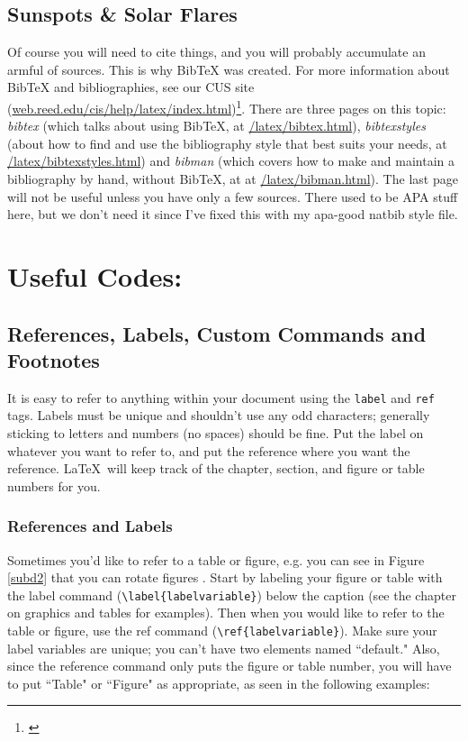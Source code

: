 \documentclass[12pt,twoside]{reedthesis}
\begin{document}
\begin{enumerate}
\begin{enumerate}
\section{Sunspots & Solar Flares}
	Of course you will need to cite things, and you will probably accumulate an armful of sources. This is why BibTeX was created. For more information about BibTeX and bibliographies, see our CUS site (\url{web.reed.edu/cis/help/latex/index.html})\footnote{\cite{reedweb:2007}}. There are three pages on this topic: {\it bibtex} (which talks about using BibTeX, at \url{/latex/bibtex.html}), {\it bibtexstyles} (about how to find and use the bibliography style that best suits your needs, at \url{/latex/bibtexstyles.html}) and {\it bibman} (which covers how to make and maintain a bibliography by hand, without BibTeX, at at \url{/latex/bibman.html}). The last page will not be useful unless you have only a few sources. There used to be APA stuff here, but we don't need it since I've fixed this with my apa-good natbib style file.






\chapter{Useful Codes:}
	
	
\section{References, Labels, Custom Commands and Footnotes}
It is easy to refer to anything within your document using the \texttt{label} and \texttt{ref} tags.  Labels must be unique and shouldn't use any odd characters; generally sticking to letters and numbers (no spaces) should be fine. Put the label on whatever you want to refer to, and put the reference where you want the reference. \LaTeX\ will keep track of the chapter, section, and figure or table numbers for you. 

\subsection{References and Labels}
Sometimes you'd like to refer to a table or figure, e.g. you can see in Figure \ref{subd2} that you can rotate figures . Start by labeling your figure or table with the label command (\verb=\label{labelvariable}=) below the caption (see the chapter on graphics and tables for examples). Then when you would like to refer to the table or figure, use the ref command (\verb=\ref{labelvariable}=). Make sure your label variables are unique; you can't have two elements named ``default." Also, since the reference command only puts the figure or table number, you will have to put  ``Table" or ``Figure" as appropriate, as seen in the following examples:


\end{enumerate}
\end{enumerate}
\end{document}
